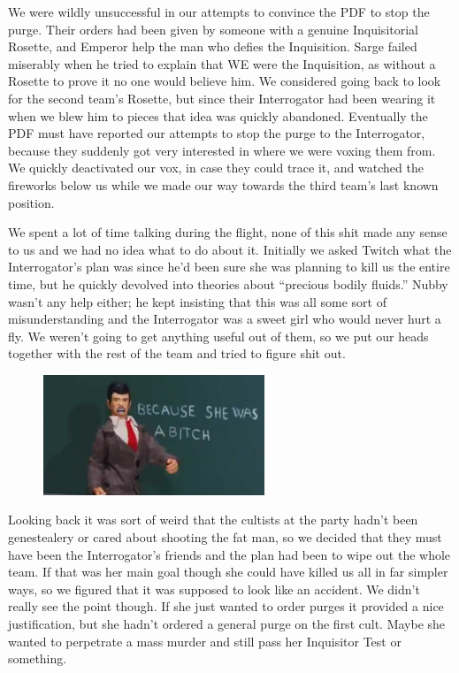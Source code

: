 We were wildly unsuccessful in our attempts to convince the PDF to stop the purge. 
Their orders had been given by someone with a genuine Inquisitorial Rosette, and Emperor help the man who defies the Inquisition. 
Sarge failed miserably when he tried to explain that WE were the Inquisition, as without a Rosette to prove it no one would believe him. 
We considered going back to look for the second team’s Rosette, but since their Interrogator had been wearing it when we blew him to pieces that idea was quickly abandoned. 
Eventually the PDF must have reported our attempts to stop the purge to the Interrogator, because they suddenly got very interested in where we were voxing them from. 
We quickly deactivated our vox, in case they could trace it, and watched the fireworks below us while we made our way towards the third team’s last known position.

We spent a lot of time talking during the flight, none of this shit made any sense to us and we had no idea what to do about it. 
Initially we asked Twitch what the Interrogator’s plan was since he’d been sure she was planning to kill us the entire time, but he quickly devolved into theories about “precious bodily fluids.” 
Nubby wasn’t any help either; 
he kept insisting that this was all some sort of misunderstanding and the Interrogator was a sweet girl who would never hurt a fly. 
We weren’t going to get anything useful out of them, so we put our heads together with the rest of the team and tried to figure shit out.

\begin{figure}
	\begin{center}
		\includegraphics[width=\figwidth]{pics/5/26.png}
	\end{center}
\end{figure}
Looking back it was sort of weird that the cultists at the party hadn’t been genestealery or cared about shooting the fat man, so we decided that they must have been the Interrogator’s friends and the plan had been to wipe out the whole team. 
If that was her main goal though she could have killed us all in far simpler ways, so we figured that it was supposed to look like an accident. 
We didn’t really see the point though. 
If she just wanted to order purges it provided a nice justification, but she hadn’t ordered a general purge on the first cult. 
Maybe she wanted to perpetrate a mass murder and still pass her Inquisitor Test or something.

